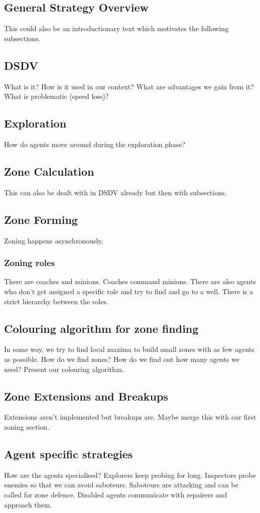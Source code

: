 \subsection{General Strategy Overview}
This could also be an introductionary text which motivates the following subsections.
\subsection{DSDV}
What is it? How is it used in our context? What are advantages we gain from it? What is problematic (speed loss)?
\subsection{Exploration}
How do agents move around during the exploration phase?
\subsection{Zone Calculation}
This can also be dealt with in DSDV already but then with subsections.
\subsection{Zone Forming}
Zoning happens asynchronously.
\subsubsection{Zoning roles}
There are coaches and minions. Coaches command minions. There are also agents who don't get assigned a specific role and try to find and go to a well. There is a strict hierarchy between the roles.
\subsection{Colouring algorithm for zone finding}
In some way, we try to find local maxima to build small zones with as few agents as possible. How do we find zones? How do we find out how many agents we need? Present our colouring algorithm.
\subsection{Zone Extensions and Breakups}
Extensions aren't implemented but breakups are. Maybe merge this with our first zoning section.
\subsection{Agent specific strategies}
How are the agents specialised? Explorers keep probing for long. Inspectors probe enemies so that we can avoid saboteurs. Saboteurs are attacking and can be called for zone defence. Disabled agents communicate with repairers and approach them.
